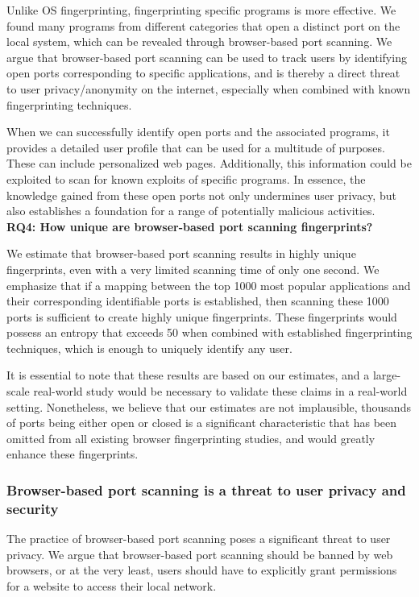 Unlike OS fingerprinting, fingerprinting specific programs is more effective. 
We found many programs from different categories that open a distinct port on the local system, which can be revealed through browser-based port scanning. 
We argue that browser-based port scanning can be used to track users by identifying open ports corresponding to specific applications, and is thereby a direct threat to user privacy/anonymity on the internet, especially when combined with known fingerprinting techniques.

When we can successfully identify open ports and the associated programs, it provides a detailed user profile that can be used for a multitude of purposes. These can include personalized web pages.
Additionally, this information could be exploited to scan for known exploits of specific programs. 
In essence, the knowledge gained from these open ports not only undermines user privacy, but also establishes a foundation for a range of potentially malicious activities.
\\

\textbf{RQ4: How unique are browser-based port scanning fingerprints?}

We estimate that browser-based port scanning results in highly unique fingerprints, even with a very limited scanning time of only one second. We emphasize that if a mapping between the top 1000 most popular applications and their corresponding identifiable ports is established, then scanning these 1000 ports is sufficient to create highly unique fingerprints. These fingerprints would possess an entropy that exceeds 50 when combined with established fingerprinting techniques, which is enough to uniquely identify any user.

It is essential to note that these results are based on our estimates, and a large-scale real-world study would be necessary to validate these claims in a real-world setting. Nonetheless, we believe that our estimates are not implausible, thousands of ports being either open or closed is a significant characteristic that has been omitted from all existing browser fingerprinting studies, and would greatly enhance these fingerprints.


\subsubsection{Browser-based port scanning is a threat to user privacy and security}

The practice of browser-based port scanning poses a significant threat to user privacy. We argue that browser-based port scanning should be banned by web browsers, or at the very least, users should have to explicitly grant permissions for a website to access their local network. 

